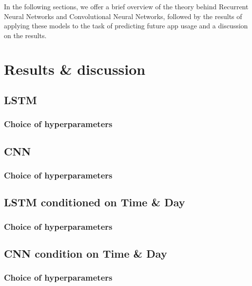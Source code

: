  In the following sections, we offer a brief overview of the theory behind Recurrent Neural Networks and Convolutional Neural Networks, followed by the results of applying these models to the task of predicting future app usage and a discussion on the results.

 \section{Results \& discussion}




 \subsection{LSTM}
 \subsubsection{Choice of hyperparameters}

 \subsection{CNN}
 \subsubsection{Choice of hyperparameters}
 \subsection{LSTM conditioned on Time \& Day}
 \subsubsection{Choice of hyperparameters}
 \subsection{CNN condition on Time \& Day}
 \subsubsection{Choice of hyperparameters}
